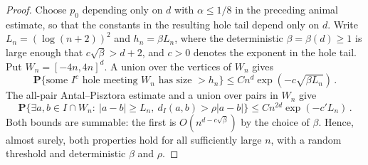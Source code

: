 \documentclass[12pt]{amsart}
\begin{document}
\begin{proof}
Choose $p_0$ depending only on $d$ with $\alpha\leq1/8$ in the preceding animal estimate, so that the constants in the resulting hole tail depend only on $d$. Write $L_n=(\log(n+2))^2$ and $h_n=\beta L_n$, where the deterministic $\beta=\beta(d)\geq1$ is large enough that $c\sqrt\beta>d+2$, and $c>0$ denotes the exponent in the hole tail. Put $W_n=[-4n,4n]^d$. A union over the vertices of $W_n$ gives
\begin{equation*}
 \mathbf P\{\text{some $I^c$ hole meeting $W_n$ has size $>h_n$}\}
 \leq Cn^d\exp(-c\sqrt{\beta L_n})\,.
\end{equation*}
The all-pair Antal--Pisztora estimate \cite{antal1996chemical} and a union over pairs in $W_n$ give
\begin{equation*}
 \mathbf P\{\exists a,b\in I\cap W_n:\ |a-b|\geq L_n,\
                    d_I(a,b)>\rho|a-b|\}
 \leq Cn^{2d}\exp(-c'L_n)\,.
\end{equation*}
Both bounds are summable: the first is $O(n^{d-c\sqrt\beta})$ by the choice of $\beta$. Hence, almost surely, both properties hold for all sufficiently large $n$, with a random threshold and deterministic $\beta$ and $\rho$.


\end{proof}
\end{document}

